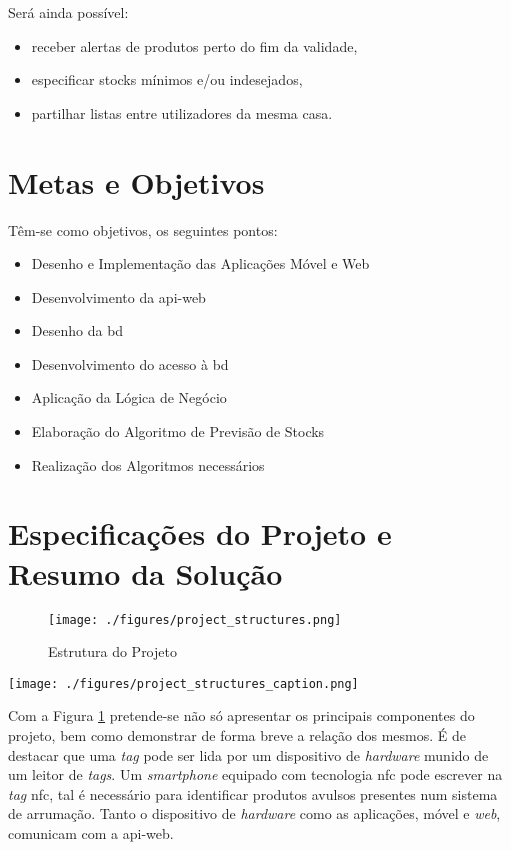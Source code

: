 Será ainda possível:
\begin{itemize} \itemsep 0pt
	\item receber alertas de produtos perto do fim da validade,
	\item especificar stocks mínimos e/ou indesejados,
	\item partilhar listas entre utilizadores da mesma casa.
\end{itemize}

%
%
\section{Metas e Objetivos} \label{sec12}
Têm-se como objetivos, os seguintes pontos:
\begin{itemize} \itemsep 0pt
	\item Desenho e Implementação das Aplicações Móvel e Web
	\item Desenvolvimento da \gls{api-web}
	\item Desenho da \acrlong{bd}
	\item Desenvolvimento do acesso à \acrlong{bd}
	\item Aplicação da Lógica de Negócio
	\item Elaboração do Algoritmo de Previsão de Stocks
	\item Realização dos Algoritmos necessários
\end{itemize}


%
%
\section{Especificações do Projeto e Resumo da Solução} \label{sec13}

\begin{figure}[H]
	\centering
	\texttt{[image: ./figures/project\_structures.png]}
	\caption{Estrutura do Projeto}
	\label{project-structure}
\end{figure}

\begin{center}
	\texttt{[image: ./figures/project\_structures\_caption.png]}
\end{center}

Com a Figura \ref{project-structure} pretende-se não só apresentar os principais componentes do projeto, bem como demonstrar de forma breve a relação dos mesmos. É de destacar que uma \textit{tag} pode ser lida por um dispositivo de \textit{hardware} munido de um leitor de \textit{tags}. Um \textit{smartphone} equipado com tecnologia \acrshort{nfc} pode escrever na \textit{tag} \acrshort{nfc}, tal é necessário para identificar produtos avulsos presentes num sistema de arrumação. Tanto o dispositivo de \textit{hardware} como as aplicações, móvel e \textit{web}, comunicam com a \gls{api-web}.\\

